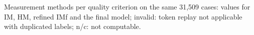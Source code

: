 \begin{table}[t]
\centering
\small
\caption{Measurement methods per quality criterion on the same 31,509 cases: values for IM, HM, refined IMf and the final model; invalid: token replay not applicable with duplicated labels; n/c: not computable.}
\label{tab:metric-methods}
\resizebox{\textwidth}{!}{}
\end{table}



